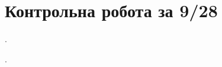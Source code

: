 \setcounter{section}{3}

\section{Контрольна робота за 9/28}

\begin{problem*}
    .
\end{problem*}

\begin{solution}
    .
\end{solution}